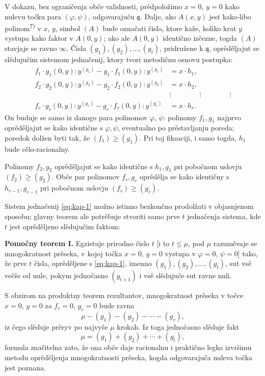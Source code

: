 \documentclass[11pt]{article}
\theoremstyle{plain}
\begin{document}
V dokazu, bez ograničenja obče validnosti, prědpoložimo $x = 0$,
$y = 0$ kako nulevu točku para $(\varphi, \psi)$, odgovarajuču
$\mathfrak{q}$. Dalje, ako $A(x,y)$ jest kako-libo polinom\textsuperscript{7)}
v $x$, $y$, simbol $(A)$ bude označati čislo, ktore kaže, koliko
krat $y$ vystupa kako faktor v $A(0,y)$; ako ale $A(0,y)$
identično izčezne, togda $(A)$ stavjaje se ravno $\infty$. Čisla
$(g_{1}), (g_{2}), \ldots, (g_{t})$, pridružene k $\mathfrak{q}$,
oprěděljajut se slědujučim sistemom jednačenij, ktory tvori
metodičnu osnovu postupka:
\begin{equation}\label{eq:kap-1}
\begin{aligned}
f_{1}\cdot g_{1}(0,y):y^{(g_{1})} - g_{1}\cdot f_{1}(0,y):y^{(g_{1})} &= x\cdot h_{1},\\
f_{2}\cdot g_{2}(0,y):y^{(g_{2})} - g_{2}\cdot f_{2}(0,y):y^{(g_{2})} &= x\cdot h_{2},\\
&\vdots \qquad\qquad\vdots\qquad\qquad\vdots\\
f_{r}\cdot g_{r}(0,y):y^{(g_{r})} - g_{r}\cdot f_{r}(0,y):y^{(g_{r})} &= x\cdot h_{r}.
\end{aligned}
\end{equation}
On buduje se samo iz danogo para polinomov $\varphi$, $\psi$:
polinomy $f_{1}, g_{1}$ najprvo oprěděljajut se kako identične s
$\varphi, \psi$, eventualno po prěstavljanju poreda; poredok
dolžen byti tak, že $(f_{1}) \geq (g_{1})$. Pri toj fiksaciji, i
samo togda, $h_{1}$ bude cělo-racionalny.

Polinomy $f_{2}, g_{2}$ oprěděljajut se kako identične s
$h_{1}, g_{1}$ pri pobočnom uslovju $(f_{2}) \geq (g_{2})$. Obče par
polinomov $f_{r}, g_{r}$ oprědělja se kako identičny s
$h_{r-1}, g_{r-1}$ pri pobočnom uslovju $(f_{r}) \geq (g_{r})$.

Sistem jednačenij \eqref{eq:kap-1} možno istinno bezkončno
prodolžati v objasnjenom sposobu; glavny teorem ale potrěbuje
stvoriti samo prve $t$ jednačenja sistema, kde $t$ jest oprěděljeno
slědujučim faktom:

\smallskip
\textbf{Pomočny teorem I.} Egzistuje prirodno čislo $t$ [i to
$t \leq \mu$, pod $\mu$ razuměvaje se mnogokratnost prěseka, v kojoj
točka $x = 0$, $y = 0$ vystupa v $\varphi = 0$, $\psi = 0$] tako, že
prve $t$ čisla, oprěděljene s \eqref{eq:kap-1}, imenno
$(g_{1}), (g_{2}), \ldots, (g_{t})$, sut vsě večše od nule, pokym
jednočasno $(g_{t+1})$ i vsě slědujuče sut ravne nuli.

S obzirom na produktny teorem rezultantov, mnogokratnost
prěseka v točce $x = 0$, $y = 0$ za $f_{r} = 0$, $g_{r} = 0$ bude
ravna
\[
\mu - (g_{1}) - (g_{2}) - \cdots - (g_{r}),
\]
iz čego slěduje prěryv po najvyše $\mu$ krokah. Iz toga jednočasno
slěduje fakt
\begin{equation}\label{eq:kap-2}
\mu = (g_{1}) + (g_{2}) + \cdots + (g_{t}),
\end{equation}
formula značitelna zato, že ona obče daje racionalnu i praktično
legko izvršimu metodu oprěděljenja mnogokratnosti prěseka, kogda
odgovarajuča nuleva točka jest poznana.
\end{document}
